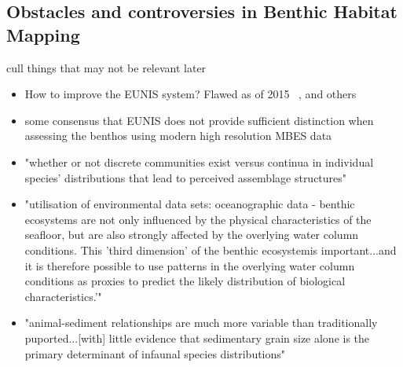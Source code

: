 \subsection {Obstacles and controversies in Benthic Habitat Mapping}
 cull things that may not be relevant later
 \begin{itemize}
     \item How to improve the EUNIS system? Flawed as of 2015 ~\citep*{calvert15}, and others
     \item some consensus that EUNIS does not provide sufficient distinction when assessing the benthos using modern high resolution MBES data ~\citep*{calvert15}
     \item "whether or not discrete communities exist versus continua in individual species' distributions that lead to perceived assemblage structures" ~\citep*{cjbrown11}
     \item "utilisation of environmental data sets: oceanographic data - benthic ecosystems are not only influenced by the physical characteristics of the seafloor, but are also strongly affected by the overlying water column conditions. This 'third dimension' of the benthic ecosystemis important...and it is therefore possible to use patterns in the overlying water column conditions as proxies to predict the likely distribution of biological characteristics.'" ~\citep*{cjbrown11}
     \item "animal-sediment relationships are much more variable than traditionally puported...[with] little evidence that sedimentary grain size alone is the primary determinant of infaunal species distributions" ~\citep*{snelgrove94}
 \end{itemize}

